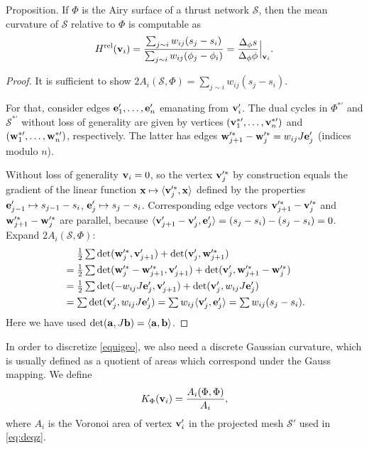 \documentclass[review]{acmsiggraph}
\def\<{\mathchoice{\big\langle}{\langle}{\langle}{\langle}}
\def\>{\mathchoice{\big\rangle}{\rangle}{\rangle}{\rangle}}
\def\rel{{\mathord{{\rm rel}}}}
\def\SS{{\mathcal S}}
\begin{document}
\proclaim Proposition.
 If $\Phi$ is the Airy surface of a thrust network $\SS$, then the mean 
curvature of $\SS$ relative to $\Phi$ is computable as
	\begin{equation}
	\label{eq:Hrel}
		H^\rel(\vw_i)
	=
		{\sum_{j\sim i} w_{ij} (s_j-s_i)
		\over \sum_{j\sim i} w_{ij} (\phi_j-\phi_i) }
	=
		{\Delta_\phi s\over \Delta_\phi \phi}\Big|_{\vw_i}.
	\end{equation}

\begin{proof} It is sufficient to show 
	$
	2A_i(\SS,\Phi)
	= \sum_{j\sim i} w_{ij} (s_j-s_i).
	$

 For that, consider edges ${\mathbf e}'_1,\dots,{\mathbf e}'_n$ emanating from ${\mathbf v}_i'$. 
The dual cycles in $\Phi^{*\prime}$ and $\SS^{*\prime}$ without loss of 
generality are given by vertices $({\mathbf v}^{*\prime}_1,\dots,{\mathbf v}^{*\prime}_n)$ 
and $({\mathbf w}^{*\prime}_1,\dots,{\mathbf w}^{*\prime}_n)$, respectively. The latter 
has edges ${\mathbf w}'^*_{j+1}-{\mathbf w}'^*_j = w_{ij} J{\mathbf e}'_j$ (indices modulo $n$).

Without loss of generality ${\mathbf v}_i=0$, so the vertex ${\mathbf v}'^*_j$ by 
construction equals the gradient of the linear function $\xw\mapsto 
\<\vw'^*_j,\xw\>$ defined by the properties ${\mathbf e}'_{j-1}\mapsto 
s_{j-1}-s_i$, ${\mathbf e}'_j\mapsto s_j-s_i$. Corresponding edge vectors 
${\mathbf v}'^*_{j+1}-{\mathbf v}'^*_j$ and ${\mathbf w}'^*_{j+1}-{\mathbf w}'^*_j$ are parallel, because 
$\<\vw'_{j+1}-\vw'_j,\ew'_j\>=(s_j-s_i)-(s_j-s_i)=0$. Expand 
$2A_i(\SS,\Phi)$:
	\begin{align*}
	& \mathrel{\hphantom{=}} \textstyle
		{1\over 2}\sum
		\det(\ww'^*_j, \vw'_{j+1}) + \det(\vw'_j, \ww'^*_{j+1})
	\\
	&=\textstyle
		{1\over 2}\sum
		\det(\ww'^*_j-\ww'^*_{j+1}, \vw'_{j+1})
		+ \det(\vw'_j, \ww'^*_{j+1}-\ww'^*_j)
		\\
	&=\textstyle
		{1\over 2}\sum
		\det( - w_{ij} J\ew'_j, \vw'_{j+1})
	 	+ \det(\vw'_j,w_{ij} J\ew'_j)
	\\
	&= \textstyle
		\sum \det( \vw'_j, w_{ij} J\ew'_j)
	=	 \sum	w_{ij} \< \vw'_j, \ew'_j\>
	= 	 \sum  w_{ij} (s_j-s_i).
	\end{align*}
 Here we have used $\det(\aw,J\bw)=\<\aw,\bw\>$.
 \end{proof}


In order to discretize \eqref{equigeo}, we also need a discrete Gaussian
curvature, which is usually defined as a quotient of areas which
correspond under the Gauss mapping. We define
	\begin{align*}
	K_\Phi({\mathbf v}_i) = {A_i(\Phi,\Phi) \over A_i},
	\end{align*}
 where $A_i$ is the Voronoi area of vertex ${\mathbf v}_i'$ in the projected mesh
$\SS'$ used in \eqref{eq:deqz}.
\end{document}
